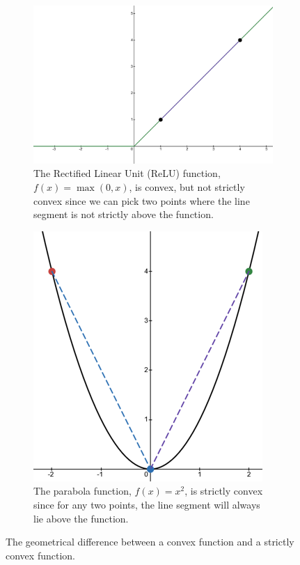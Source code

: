 \begin{figure}[h]
    \begin{subfigure}[b]{0.48\linewidth}
        \centering
        \includegraphics[width=0.8\linewidth]{figures/2background/relu.png}
        \caption{The Rectified Linear Unit (ReLU) function, $f(x) = \max(0, x)$, is convex, but not strictly convex since we can pick two points where the line segment is not strictly above the function.}
        \label{fig:convex_relu}
    \end{subfigure}
    \hfill
    \begin{subfigure}[b]{0.48\linewidth}
        \centering
        \includegraphics[width=0.6\linewidth]{figures/2background/parabola.png}
        \caption{The parabola function, $f(x) = x^2$, is strictly convex since for any two points, the line segment will always lie above the function.}
        \label{fig:strict_convex_parabola}
    \end{subfigure}
    \caption{The geometrical difference between a convex function and a strictly convex function.}
    \label{fig:diff_geometric_convexity}
\end{figure}


